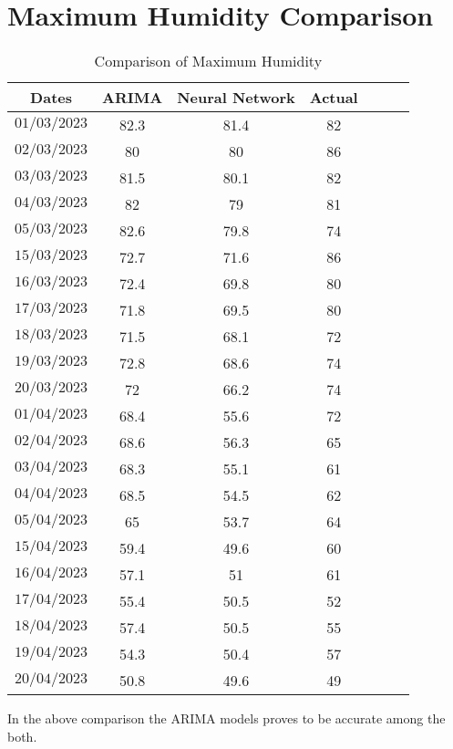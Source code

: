 \section{Maximum Humidity Comparison}
\begin{table}[h]
\centering
\caption{Comparison of Maximum Humidity}
\begin{tabular}{ccccccc}
\toprule
\textbf{Dates} & \textbf{ARIMA} & \textbf{Neural Network} & \textbf{Actual}   \\
\hline
$01/03/2023$ & 82.3 & 81.4 & 82 \\
\hline
$02/03/2023$ & 80 & 80 & 86 \\
\hline
$03/03/2023$ & 81.5 & 80.1 & 82 \\
\hline
$04/03/2023$ & 82 & 79 & 81 \\
\hline
$05/03/2023$ & 82.6 & 79.8 & 74 \\
\hline
$15/03/2023$ & 72.7 & 71.6 & 86 \\
\hline
$16/03/2023$ & 72.4 & 69.8 & 80 \\
\hline
$17/03/2023$ & 71.8 & 69.5 & 80 \\
\hline
$18/03/2023$ & 71.5 & 68.1 & 72 \\
\hline
$19/03/2023$ & 72.8 & 68.6 & 74 \\
\hline
$20/03/2023$ & 72 & 66.2 & 74 \\
\hline
$01/04/2023$ & 68.4 & 55.6 & 72 \\
\hline
$02/04/2023$ & 68.6 & 56.3 & 65 \\
\hline
$03/04/2023$ & 68.3 & 55.1 & 61 \\
\hline
$04/04/2023$ & 68.5 & 54.5 & 62 \\
\hline
$05/04/2023$ & 65 & 53.7 & 64 \\
\hline
$15/04/2023$ & 59.4 & 49.6 & 60 \\
\hline
$16/04/2023$ & 57.1 & 51 & 61 \\
\hline
$17/04/2023$ & 55.4 & 50.5 & 52 \\
\hline
$18/04/2023$ & 57.4 & 50.5 & 55 \\
\hline
$19/04/2023$ & 54.3 & 50.4 & 57 \\
\hline
$20/04/2023$ & 50.8 & 49.6 & 49 \\
\bottomrule
\end{tabular}
\end{table}

In the above comparison the ARIMA models proves to be accurate among the both.



